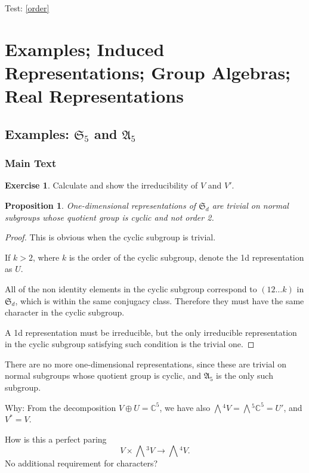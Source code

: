 \documentclass[12pt, letterpaper]{article}
\newcommand{\co}{\mathbb{C}}
\newcommand{\ext}[1]{\bigwedge\!^{#1}}
\newcommand{\red}[1]{{\color{red} #1}}
\newtheorem{prop}{Proposition}[section]
\theoremstyle{definition}
\theoremstyle{remark}
\theoremstyle{definition}
\newtheorem{exe}{Exercise}[section]
\theoremstyle{plain}
\numberwithin{equation}{section}
\begin{document}
	Test: \autoref{order}
	
	\section{Examples; Induced Representations; Group Algebras; Real Representations}
	\subsection{Examples: $\mathfrak{S}_5$ and $\mathfrak{A}_5$}
	\subsubsection{Main Text}
	\begin{exe}
		Calculate and show the irreducibility of $V$ and $V'$.
	\end{exe}
	\begin{prop}
		One-dimensional representations of $\mathfrak{S}_d$
		are trivial on normal subgroups whose quotient group is cyclic and not order 2.
	\end{prop}
	\begin{proof}
		This is obvious when the cyclic subgroup is trivial.
		
		If $k>2$, where $k$ is the order of the cyclic subgroup,
		denote the 1d representation as $U$.
		
		All of the non identity elements in the cyclic subgroup correspond to
		$(12\dots k)$ in $\mathfrak{S}_d$, which is within the same conjugacy class.
		Therefore they must have the same character in the cyclic subgroup.
		
		A 1d representation must be irreducible, but the only irreducible representation
		in the cyclic subgroup
		satisfying such condition is the trivial one.
		
	\end{proof}

	\red{There are no more one-dimensional representations, since 
		these are trivial on normal subgroups whose quotient group is cyclic, and $\mathfrak{A}_5$
	is the only such subgroup.}

	\red{Why: From the decomposition $V \oplus U = \co^5$,
		we have also $\ext{4}V = \ext{5}\co^5 = U'$, 
		and $V^* = V$.}

	\red{How is this a perfect paring \[V\times \ext{3}V \to \ext{4}V. \]
	No additional requirement for characters?}
\end{document}
